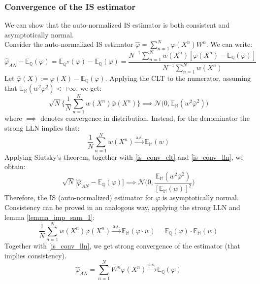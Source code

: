 \documentclass[
]{book}
\theoremstyle{break}
\theoremstyle{nonumberplain}
\begin{document}
\subsubsection{Convergence of the IS estimator}\label{pf_is_conv}

We can show that the auto-normalized IS estimator is both consistent and
asymptotically normal.\\
Consider the auto-normalized IS estimator
\(\hat \varphi= \sum_{n=1}^N\varphi (X^n)W^n\). We can write:
\begin{equation*}
   \hat \varphi_{AN} - \mathbb E_{\mathbb Q}(\varphi)=\mathbb E_{\mathbb Q^N}(\varphi)-\mathbb E_{\mathbb Q}(\varphi)=\frac{N^{-1}\sum_{n=1}^Nw(X^n)[\varphi(X^n)-\mathbb E_{\mathbb Q}(\varphi)]}{N^{-1}\sum_{n=1}^Nw(X^n)}
\end{equation*} Let
\(\bar \varphi(X):=\varphi(X)-\mathbb E_{\mathbb Q}(\varphi)\). Applying
the CLT to the numerator, assuming that
\(\mathbb E_{\mathbb M}(w^2\bar\varphi^2)<+\infty\), we get:
\begin{equation}
    \sqrt{N}\Bigg\{\frac{1}{N}\sum_{n=1}^Nw(X^n)\bar \varphi (X^n)\Bigg\}\implies \mathcal N\big(0,\mathbb E_{\mathbb M}(w^2\bar\varphi^2)\big)\label{is_conv_clt}
\end{equation} where \(\implies\) denotes convergence in distribution.
Instead, for the denominator the strong LLN implies that:
\begin{equation}
    \frac{1}{N}\sum_{n=1}^Nw(X^n)\xrightarrow{\text{a.s.}} \mathbb E_{\mathbb M}(w) \label{is_conv_lln}
\end{equation} Applying Slutsky's theorem, together with
\eqref{is_conv_clt} and \eqref{is_conv_lln}, we obtain: \begin{equation}
   \sqrt{N}\big[  \hat \varphi_{AN} - \mathbb E_{\mathbb Q}(\varphi)\big] \implies \mathcal N\Bigg(0,\frac{\mathbb E_{\mathbb M}(w^2\bar\varphi^2)}{[\mathbb E_{\mathbb M}(w)]^2}\Bigg)
\end{equation} Therefore, the IS (auto-normalized) estimator for
\(\varphi\) is asymptotically normal. Consistency can be proved in an
analogous way, applying the strong LLN and lemma \ref{lemma_imp_sam_1}:
\begin{equation}
    \frac{1}{N}\sum_{n=1}^Nw(X^n) \varphi (X^n)\xrightarrow{\text{a.s.}}  \mathbb E_\mathbb M(\varphi \cdot w)=\mathbb E_\mathbb Q(\varphi)\cdot \mathbb E_\mathbb M(w)
\end{equation} Together with \eqref{is_conv_lln}, we get strong
convergence of the estimator (that implies consistency).
\begin{equation}
   \hat \varphi_{AN}=\sum_{n=1}^NW^n \varphi (X^n)\xrightarrow{\text{a.s.}}  \mathbb E_\mathbb Q(\varphi)
\end{equation}
\end{document}
